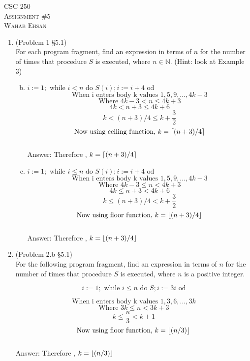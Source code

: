 \documentclass[12pt]{article}
\DeclarePairedDelimiter{\ceil}{\lceil}{\rceil}
\DeclarePairedDelimiter\floor{\lfloor}{\rfloor}
\newcommand{\NN}{\mathbb{N}}
\begin{document}
\begin{center}
\textsc{CSC 250 \\ Assignment \#5}\\
\textsc{Wahab Ehsan}
\end{center}







\begin{enumerate}
\item (Problem 1 \S 5.1)\\
For each program fragment, find an expression in terms of $n$ for the number of times that procedure $S$ is executed, where $n\in \NN$. (Hint: look at Example 3)
\begin{enumerate}[a.]
\setcounter{enumii}{1}
\item $i:=1;\text{ while }i<n\text{ do }S(i);i:=i+4\text{ od}$
\[\text{When i enters body k values } 1,5,9,...,4k-3\]
\[\text{Where } 4k-3 < n\leq4k+3\]
\[4k < n +3 \leq 4k+6\]
\[k < (n+3)/4\leq k+\frac{3}{2}\]
\[\text{Now using ceiling function, }k=\ceil{(n+3)/4}\]
\\ Answer: Therefore , $k = \ceil{(n+3)/4}$
\setcounter{enumii}{3}
\item $i:=1;\text{ while }i\leq n\text{ do }S(i);i:=i+4\text{ od}$
\[\text{When i enters body k values } 1,5,9,...,4k-3\]
\[\text{Where } 4k-3 \leq n < 4k+3\]
\[4k \leq n +3 < 4k+6\]
\[k \leq (n+3)/4< k+\frac{3}{2}\]
\[\text{Now using floor function, }k=\floor{(n+3)/4}\]
\\ Answer: Therefore , $k=\floor{(n+3)/4}$
\end{enumerate}











\item (Problem 2.b \S 5.1)\\
For  the following program fragment, find an expression in terms of $n$ for the number of times that procedure $S$ is executed, where $n$ is a positive integer.

\[i:=1;\text{ while }i\leq n\text{ do }S;i:=3i\text{ od}\]

\[\text{When i enters body k values } 1,3,6,...,3k\]
\[\text{Where } 3k \leq n < 3k+3\]
\[k \leq \frac{n}{3} < k+1\]
\[\text{Now using floor function, }k=\floor{(n/3)}\]
\\ Answer: Therefore , $k=\floor{(n/3)}$









\end{enumerate}
\end{document}
